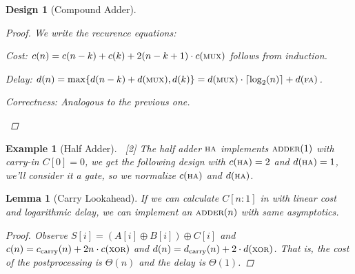 \documentclass[12pt]{article}
\newcommand{\scr}[1]{{\scriptstyle\textup{#1}}}
\DeclareMathOperator{\XOR}{\scr{XOR}}
\DeclareMathOperator{\MUX}{\scr{MUX}}
\newcommand{\ceil}[1]{\left\lceil{#1}\right\rceil}
\newtheorem{lemma}[theorem]{Lemma}
\newtheorem{example}[theorem]{Example}
\newtheorem{design}[theorem]{Design}
\begin{document}
\begin{design}[Compound Adder]
\begin{compactenum}[(i)]
  \end{compactenum}
  \begin{proof}
    We write the recurence equations:
    \begin{compactenum}[(i)]
      \item Cost: $c(n)=c(n-k)+c(k)+2(n-k+1)\cdot c(\MUX)$ follows from induction.
      \item Delay: $d(n)=\max\{d(n-k)+d(\MUX),d(k)\}=d(\MUX)\cdot \ceil{\log_2(n)}+d(\scr{FA})$.
    \item Correctness: Analogous to the previous one.
    \end{compactenum}
  \end{proof}
\end{design}

\begin{example}[Half Adder]
  $\,$
  [2]
  \noindent The half adder $\scr{HA}$ implements $\scr{ADDER}(1)$ with carry-in $C[0]=0$, we get the following design with $c(\scr{HA})=2$ and $d(\scr{HA})=1$, we'll consider it a gate, so we normalize $c(\scr{HA})$ and $d(\scr{HA})$.
\end{example}

\begin{lemma}[Carry Lookahead]
  If we can calculate $C[n:1]$ in with linear cost and logarithmic delay, we can implement an $\scr{ADDER}(n)$ with same asymptotics.
  \begin{proof}
    Observe $S[i]=(A[i]\oplus B[i])\oplus C[i]$ and $c(n)=c_\text{carry}(n)+2n\cdot c(\XOR)$ and  $d(n)=d_\text{carry}(n)+2\cdot d(\XOR)$. That is, the cost of the postprocessing is $\Theta(n)$ and the delay is $\Theta(1)$.
  \end{proof}
\end{lemma}
\end{document}
